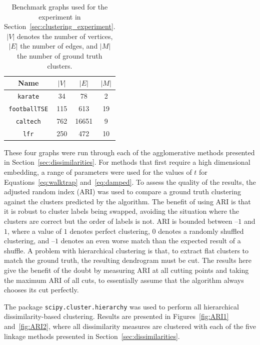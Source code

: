 \begin{table}
  \centering
  \caption[Benchmark graphs used for the experiment in Section~\ref{sec:clustering_experiment}]{Benchmark graphs used for the experiment in Section~\ref{sec:clustering_experiment}. $|V|$ denotes the number of vertices, $|E|$ the number of edges, and $|M|$ the number of ground truth clusters.}
  \setlength{\tabcolsep}{1em} %
  {\renewcommand{\arraystretch}{1.25}%
  \begin{tabular}{|c|c|c|c|}
    \hline
    Name & $|V|$ & $|E|$ & $|M|$
    \\\hline\hline
    \texttt{karate} & 34 & 78 & 2
    \\\hline
    \texttt{footballTSE} & 115 & 613 & 19
    \\\hline
    \texttt{caltech} & 762 & 16651 & 9
    \\\hline
    \texttt{lfr} & 250 & 472 & 10
    \\\hline
  \end{tabular}}
  \label{tab:bundle_graphs}
\end{table}


These four graphs were run through each of the agglomerative methods presented in Section~\ref{sec:dissimilarities}. For methods that first require a high dimensional embedding, a range of parameters were used for the values of $t$ for Equations~\eqref{eq:walktrap} and~\eqref{eq:damped}.
To assess the quality of the results, the adjusted random index (ARI) was used to compare a ground truth clustering against the clusters predicted by the algorithm. The benefit of using ARI is that it is robust to cluster labels being swapped, avoiding the situation where the clusters are correct but the order of labels is not.
ARI is bounded between --$1$ and $1$, where a value of $1$ denotes perfect clustering, $0$ denotes a randomly shuffled clustering, and --$1$ denotes an even worse match than the expected result of a shuffle.
A problem with hierarchical clustering is that, to extract flat clusters to match the ground truth, the resulting dendrogram must be cut. The results here give the benefit of the doubt by measuring ARI at all cutting points and taking the maximum ARI of all cuts, to essentially assume that the algorithm always chooses its cut perfectly.

The package \texttt{scipy.cluster.hierarchy} \cite{Virtanen2020} was used to perform all hierarchical dissimilarity-based clustering.
Results are presented in Figures~\ref{fig:ARI1} and~\ref{fig:ARI2}, where all dissimilarity measures are clustered with each of the five linkage methods presented in Section~\ref{sec:dissimilarities}.

